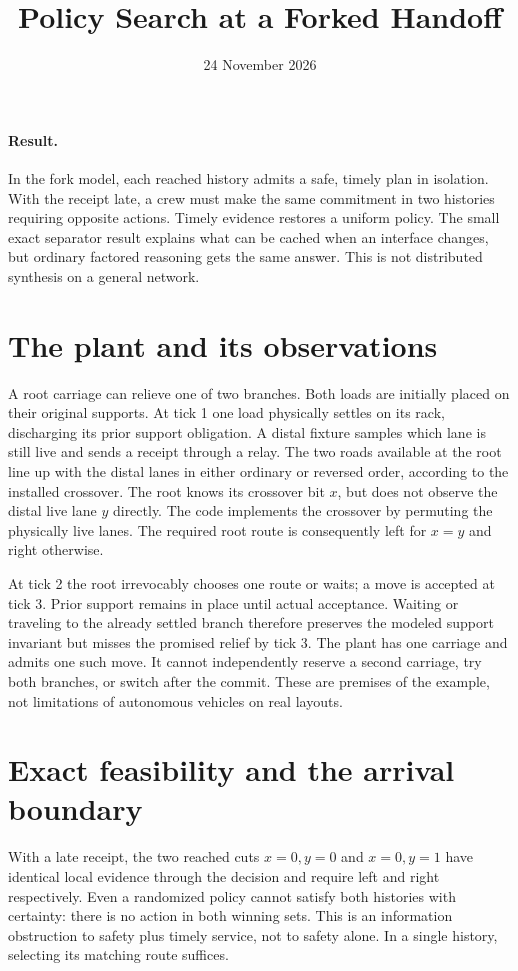 \documentclass[11pt]{article}
\title{Policy Search at a Forked Handoff}
\date{24 November 2026}
\begin{document}
\maketitle

\paragraph{Result.} In the fork model, each reached history admits a safe, timely plan in isolation. With the receipt late, a crew must make the same commitment in two histories requiring opposite actions. Timely evidence restores a uniform policy. The small exact separator result explains what can be cached when an interface changes, but ordinary factored reasoning gets the same answer. This is not distributed synthesis on a general network.

\section{The plant and its observations}
A root carriage can relieve one of two branches. Both loads are initially placed on their original supports. At tick 1 one load physically settles on its rack, discharging its prior support obligation. A distal fixture samples which lane is still live and sends a receipt through a relay. The two roads available at the root line up with the distal lanes in either ordinary or reversed order, according to the installed crossover. The root knows its crossover bit \(x\), but does not observe the distal live lane \(y\) directly. The code implements the crossover by permuting the physically live lanes. The required root route is consequently left for \(x=y\) and right otherwise.

At tick 2 the root irrevocably chooses one route or waits; a move is accepted at tick 3. Prior support remains in place until actual acceptance. Waiting or traveling to the already settled branch therefore preserves the modeled support invariant but misses the promised relief by tick 3. The plant has one carriage and admits one such move. It cannot independently reserve a second carriage, try both branches, or switch after the commit. These are premises of the example, not limitations of autonomous vehicles on real layouts.

\section{Exact feasibility and the arrival boundary}
With a late receipt, the two reached cuts \(x=0,y=0\) and \(x=0,y=1\) have identical local evidence through the decision and require left and right respectively. Even a randomized policy cannot satisfy both histories with certainty: there is no action in both winning sets. This is an information obstruction to safety plus timely service, not to safety alone. In a single history, selecting its matching route suffices.
\end{document}
